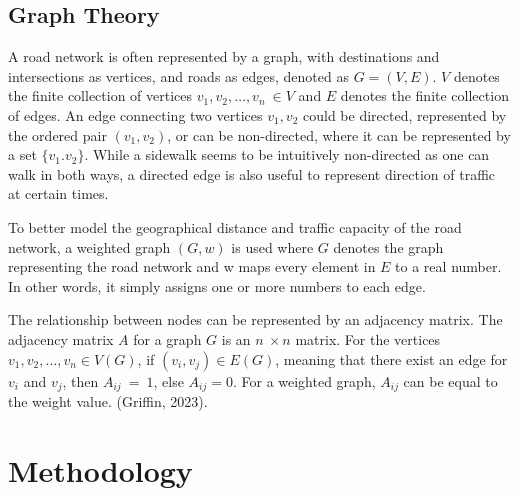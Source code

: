 \documentclass[11pt]{article}
\begin{document}
\subsection{Graph Theory}
A road network is often represented by a graph, with destinations and intersections as vertices, and roads as edges, denoted as $G=\left(V,E\right)$. $V$ denotes the finite collection of vertices $v_1,v_2,\ldots,v_n\ \in V$ and $E$ denotes the finite collection of edges. An edge connecting two vertices $v_1,v_2$ could be directed, represented by the ordered pair $\left(v_1,v_2\right)$, or can be non-directed, where it can be represented by a set $\{v_1.v_2\}$. While a sidewalk seems to be intuitively non-directed as one can walk in both ways, a directed edge is also useful to represent direction of traffic at certain times.\par
	To better model the geographical distance and traffic capacity of the road network, a weighted graph $\left(G,w\right)$ is used where $G$ denotes the graph representing the road network and w maps every element in $E$ to a real number. In other words, it simply assigns one or more numbers to each edge.\par
	The relationship between nodes can be represented by an adjacency matrix. The adjacency matrix $A$ for a graph $G$ is an $n\ \times n$ matrix. For the vertices $v_1,v_2,\ldots,v_n\in V\left(G\right)$, if $\left(v_i,v_j\right)\in E\left(G\right)$, meaning that there exist an edge for $v_i$ and $v_j$, then $A_{ij}\ =\ 1$, else $A_{ij}=0$. For a weighted graph, $A_{ij}$ can be equal to the weight value. (Griffin, 2023).\par
\section{Methodology}
\end{document}
